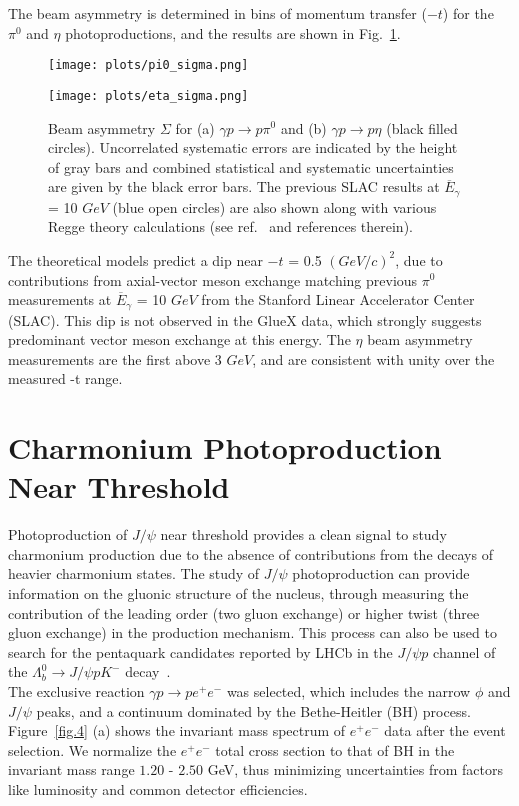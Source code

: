 \documentclass[a4paper]{jpconf}
\begin{document}
The beam asymmetry is determined in bins of momentum transfer ($-t$) for the $\pi^{0}$ and $\eta$ photoproductions, and the results are shown in Fig.~\ref{fig.3}.

\begin{figure}[h]
    \centering
    \begin{minipage}{16pc}
        \texttt{[image: plots/pi0\_sigma.png]}
    \end{minipage}\hspace{3pc}%
    \begin{minipage}{16pc}
        \texttt{[image: plots/eta\_sigma.png]}
    \end{minipage}
    \caption{\label{fig.3} Beam asymmetry $\Sigma$ for (a) $\gamma p \rightarrow p \pi^{0}$ and (b) $\gamma p \rightarrow p \eta$ (black filled circles). Uncorrelated systematic errors are indicated by the height of gray bars and combined statistical and systematic uncertainties are given by the black error bars. The previous SLAC results at $\overline{{E}}_{\gamma}$ = 10 $GeV$ (blue open circles) are also shown along with various Regge theory calculations (see ref.~\cite{ref.4} and references therein).}
\end{figure}

The theoretical models predict a dip near $-t$ = 0.5 $(GeV/c)^{2}$, due to contributions from axial-vector meson exchange matching previous $\pi^{0}$ measurements at $\overline{E}_{\gamma}$ = 10 $GeV$ from the Stanford Linear Accelerator Center (SLAC). This dip is not observed in the GlueX data, which strongly suggests predominant vector meson exchange at this energy. The $\eta$ beam asymmetry measurements are the first above 3 $GeV$, and are consistent with unity over the measured -t range.

\section{Charmonium Photoproduction Near Threshold}
Photoproduction of $J/\psi$ near threshold provides a clean signal to study charmonium production due to the absence of contributions from the decays of heavier charmonium states.
The study of $J/\psi$ photoproduction can provide information on the gluonic structure of the nucleus, through measuring the contribution of the leading order (two gluon exchange) or higher twist (three gluon exchange) in the production mechanism. This process can also be used to search for the pentaquark candidates reported by LHCb in the $J/\psi p$ channel of the $\Lambda^{0}_{b} \rightarrow J/\psi p K^{-}$ decay~\cite{ref.5}.\\
The exclusive reaction $\gamma p \rightarrow p e^{+}e^{-}$ was selected, which includes the narrow $\phi$ and $J/\psi$ peaks, and a continuum dominated by the Bethe-Heitler (BH) process. Figure~\ref{fig.4} (a) shows the invariant mass spectrum of $e^{+}e^{-}$ data after the event selection. We normalize the $e^{+}e^{-}$ total cross section to that of BH in the invariant mass range $1.20$ - $2.50$ GeV, thus minimizing uncertainties from factors like luminosity and common detector efficiencies.
\end{document}
